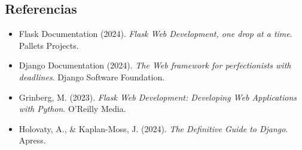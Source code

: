 \documentclass[letterpaper,12pt]{article}
\begin{document}
\begin{multicols}{2}
    \section*{Referencias}
    \begin{itemize}
        \item Flask Documentation (2024). \textit{Flask Web Development, one drop at a time}. Pallets Projects.
        \item Django Documentation (2024). \textit{The Web framework for perfectionists with deadlines}. Django Software Foundation.
        \item Grinberg, M. (2023). \textit{Flask Web Development: Developing Web Applications with Python}. O'Reilly Media.
        \item Holovaty, A., \& Kaplan-Moss, J. (2024). \textit{The Definitive Guide to Django}. Apress.
    \end{itemize}

\end{multicols}
\end{document}
